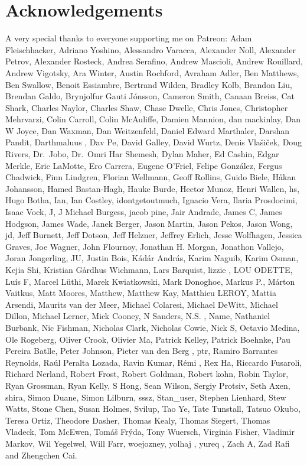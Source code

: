 \documentclass[
  letterpaper,
  DIV=11,
  numbers=noendperiod]{scrartcl}
\begin{document}
\section*{Acknowledgements}\label{acknowledgements}

A very special thanks to everyone supporting me on Patreon: Adam
Fleischhacker, Adriano Yoshino, Alessandro Varacca, Alexander Noll,
Alexander Petrov, Alexander Rosteck, Andrea Serafino, Andrew Mascioli,
Andrew Rouillard, Andrew Vigotsky, Ara Winter, Austin Rochford, Avraham
Adler, Ben Matthews, Ben Swallow, Benoit Essiambre, Bertrand Wilden,
Bradley Kolb, Brandon Liu, Brendan Galdo, Brynjolfur Gauti Jónsson,
Cameron Smith, Canaan Breiss, Cat Shark, Charles Naylor, Charles Shaw,
Chase Dwelle, Chris Jones, Christopher Mehrvarzi, Colin Carroll, Colin
McAuliffe, Damien Mannion, dan mackinlay, Dan W Joyce, Dan Waxman, Dan
Weitzenfeld, Daniel Edward Marthaler, Darshan Pandit, Darthmaluus , Dav
Pe, David Galley, David Wurtz, Denis Vlašiček, Doug Rivers, Dr.~Jobo,
Dr.~Omri Har Shemesh, Dylan Maher, Ed Cashin, Edgar Merkle, Eric
LaMotte, Ero Carrera, Eugene O'Friel, Felipe González, Fergus Chadwick,
Finn Lindgren, Florian Wellmann, Geoff Rollins, Guido Biele, Håkan
Johansson, Hamed Bastan-Hagh, Hauke Burde, Hector Munoz, Henri Wallen,
hs, Hugo Botha, Ian, Ian Costley, idontgetoutmuch, Ignacio Vera, Ilaria
Prosdocimi, Isaac Vock, J, J Michael Burgess, jacob pine, Jair Andrade,
James C, James Hodgson, James Wade, Janek Berger, Jason Martin, Jason
Pekos, Jason Wong, jd, Jeff Burnett, Jeff Dotson, Jeff Helzner, Jeffrey
Erlich, Jesse Wolfhagen, Jessica Graves, Joe Wagner, John Flournoy,
Jonathan H. Morgan, Jonathon Vallejo, Joran Jongerling, JU, Justin Bois,
Kádár András, Karim Naguib, Karim Osman, Kejia Shi, Kristian Gårdhus
Wichmann, Lars Barquist, lizzie , LOU ODETTE, Luís F, Marcel Lüthi,
Marek Kwiatkowski, Mark Donoghoe, Markus P., Márton Vaitkus, Matt
Moores, Matthew, Matthew Kay, Matthieu LEROY, Mattia Arsendi, Maurits
van der Meer, Michael Colaresi, Michael DeWitt, Michael Dillon, Michael
Lerner, Mick Cooney, N Sanders, N.S. , Name, Nathaniel Burbank, Nic
Fishman, Nicholas Clark, Nicholas Cowie, Nick S, Octavio Medina, Ole
Rogeberg, Oliver Crook, Olivier Ma, Patrick Kelley, Patrick Boehnke, Pau
Pereira Batlle, Peter Johnson, Pieter van den Berg , ptr, Ramiro
Barrantes Reynolds, Raúl Peralta Lozada, Ravin Kumar, Rémi , Rex Ha,
Riccardo Fusaroli, Richard Nerland, Robert Frost, Robert Goldman, Robert
kohn, Robin Taylor, Ryan Grossman, Ryan Kelly, S Hong, Sean Wilson,
Sergiy Protsiv, Seth Axen, shira, Simon Duane, Simon Lilburn, sssz,
Stan\_user, Stephen Lienhard, Stew Watts, Stone Chen, Susan Holmes,
Svilup, Tao Ye, Tate Tunstall, Tatsuo Okubo, Teresa Ortiz, Theodore
Dasher, Thomas Kealy, Thomas Siegert, Thomas Vladeck, Tom McEwen, Tomáš
Frýda, Tony Wuersch, Virginia Fisher, Vladimir Markov, Wil Yegelwel,
Will Farr, woejozney, yolhaj , yureq , Zach A, Zad Rafi and Zhengchen
Cai.
\end{document}
